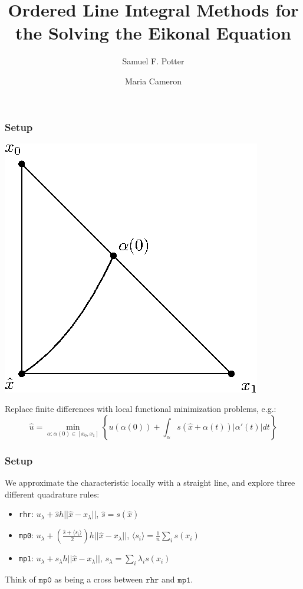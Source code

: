 \documentclass{beamer}
\title{Ordered Line Integral Methods for the Solving the Eikonal Equation}
\author{Samuel F. Potter \and Maria Cameron}
\newcommand{\parens}[1]{\left(#1\right)}
\newcommand{\set}[1]{\left\{#1\right\}}
\begin{document}
\frame{\titlepage}

\begin{frame}
  \frametitle{Setup}

  \begin{center}
    \includegraphics[width=0.35\linewidth]{path.eps}
  \end{center}

  Replace finite differences with local functional minimization
  problems, e.g.:
  \begin{equation*}
    \hat{u} = \min_{\alpha : \alpha(0) \in [x_0, x_1]} \set{u(\alpha(0)) + \int_{\alpha} s(\hat{x} + \alpha(t)) |\alpha'(t)| dt}
  \end{equation*}
\end{frame}

\begin{frame}
  \frametitle{Setup}

  We approximate the characteristic locally with a straight line, and
  explore three different quadrature rules:

  \begin{itemize}
  \item \texttt{rhr}: $u_\lambda + \hat{s} h ||\hat{x} - x_\lambda||$, \hspace{4.4em} $\hat{s} = s(\hat{x})$
  \item \texttt{mp0}: $u_\lambda + \parens{\frac{\hat{s} + \langle s_i \rangle}{2}} h ||\hat{x} - x_\lambda||$, \hspace{1.05em} $\langle s_i \rangle = \tfrac{1}{n} \sum_{i} s(x_i)$
  \item \texttt{mp1}: $u_\lambda + s_\lambda h ||\hat{x} - x_\lambda||$, \hspace{4.0em} $s_\lambda = \sum_i \lambda_i s(x_i)$
  \end{itemize}

  Think of $\texttt{mp0}$ as being a cross between $\texttt{rhr}$ and
  $\texttt{mp1}$.
\end{frame}
\end{document}
